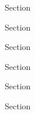 \documentclass[12pt,letterpaper]{article}
\begin{document}

                  \hypertarget{7.1}{}
\begin{secbox}{Section}{

}\end{secbox}
                  \hypertarget{7.2}{}
\begin{secbox}{Section}{

}\end{secbox}
                  \hypertarget{7.3}{}
\begin{secbox}{Section}{

}\end{secbox}
                  \hypertarget{7.4}{}
\begin{secbox}{Section}{

}\end{secbox}
                  \hypertarget{7.5}{}
\begin{secbox}{Section}{

}\end{secbox}
                  \hypertarget{7.6}{}
\begin{secbox}{Section}{

}\end{secbox}
\end{document}
